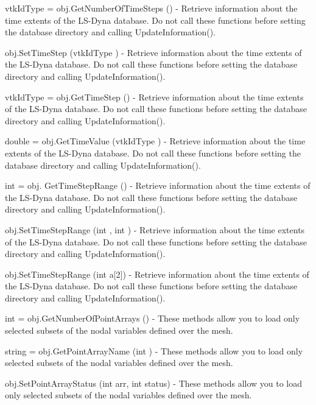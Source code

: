 \begin{DoxyItemize}
\item {\ttfamily vtk\-Id\-Type = obj.\-Get\-Number\-Of\-Time\-Steps ()} -\/ Retrieve information about the time extents of the L\-S-\/\-Dyna database. Do not call these functions before setting the database directory and calling Update\-Information().  
\item {\ttfamily obj.\-Set\-Time\-Step (vtk\-Id\-Type )} -\/ Retrieve information about the time extents of the L\-S-\/\-Dyna database. Do not call these functions before setting the database directory and calling Update\-Information().  
\item {\ttfamily vtk\-Id\-Type = obj.\-Get\-Time\-Step ()} -\/ Retrieve information about the time extents of the L\-S-\/\-Dyna database. Do not call these functions before setting the database directory and calling Update\-Information().  
\item {\ttfamily double = obj.\-Get\-Time\-Value (vtk\-Id\-Type )} -\/ Retrieve information about the time extents of the L\-S-\/\-Dyna database. Do not call these functions before setting the database directory and calling Update\-Information().  
\item {\ttfamily int = obj. Get\-Time\-Step\-Range ()} -\/ Retrieve information about the time extents of the L\-S-\/\-Dyna database. Do not call these functions before setting the database directory and calling Update\-Information().  
\item {\ttfamily obj.\-Set\-Time\-Step\-Range (int , int )} -\/ Retrieve information about the time extents of the L\-S-\/\-Dyna database. Do not call these functions before setting the database directory and calling Update\-Information().  
\item {\ttfamily obj.\-Set\-Time\-Step\-Range (int a\mbox{[}2\mbox{]})} -\/ Retrieve information about the time extents of the L\-S-\/\-Dyna database. Do not call these functions before setting the database directory and calling Update\-Information().  
\item {\ttfamily int = obj.\-Get\-Number\-Of\-Point\-Arrays ()} -\/ These methods allow you to load only selected subsets of the nodal variables defined over the mesh.  
\item {\ttfamily string = obj.\-Get\-Point\-Array\-Name (int )} -\/ These methods allow you to load only selected subsets of the nodal variables defined over the mesh.  
\item {\ttfamily obj.\-Set\-Point\-Array\-Status (int arr, int status)} -\/ These methods allow you to load only selected subsets of the nodal variables defined over the mesh.  

\end{DoxyItemize}
